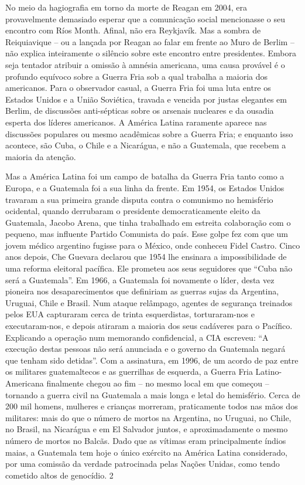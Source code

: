 No meio da hagiografia em torno da morte de Reagan em 2004, era provavelmente demasiado esperar que a comunicação social mencionasse o seu encontro com Ríos Month. Afinal, não era Reykjavík. Mas a sombra de Reiquiavique – ou a lançada por Reagan ao falar em frente ao Muro de Berlim – não explica inteiramente o silêncio sobre este encontro entre presidentes. Embora seja tentador atribuir a omissão à amnésia americana, uma causa provável é o profundo equívoco sobre a Guerra Fria sob a qual trabalha a maioria dos americanos. Para o observador casual, a Guerra Fria foi uma luta entre os Estados Unidos e a União Soviética, travada e vencida por justas elegantes em Berlim, de discussões anti-sépticas sobre os arsenais nucleares e da ousadia esperta dos líderes americanos. A América Latina raramente aparece nas discussões populares ou mesmo acadêmicas sobre a Guerra Fria; e enquanto isso acontece, são Cuba, o Chile e a Nicarágua, e não a Guatemala, que recebem a maioria da atenção.
 
\par
 
Mas a América Latina foi um campo de batalha da Guerra Fria tanto como a Europa, e a Guatemala foi a sua linha da frente. Em 1954, os Estados Unidos travaram a sua primeira grande disputa contra o comunismo no hemisfério ocidental, quando derrubaram o presidente democraticamente eleito da Guatemala, Jacobo Arena, que tinha trabalhado em estreita colaboração com o pequeno, mas influente Partido Comunista do país. Esse golpe fez com que um jovem médico argentino fugisse para o México, onde conheceu Fidel Castro. Cinco anos depois, Che Guevara declarou que 1954 lhe ensinara a impossibilidade de uma reforma eleitoral pacífica. Ele prometeu aos seus seguidores que “Cuba não será a Guatemala”. Em 1966, a Guatemala foi novamente o líder, desta vez pioneira nos desaparecimentos que definiriam as guerras sujas da Argentina, Uruguai, Chile e Brasil. Num ataque relâmpago, agentes de segurança treinados pelos EUA capturaram cerca de trinta esquerdistas, torturaram-nos e executaram-nos, e depois atiraram a maioria dos seus cadáveres para o Pacífico. Explicando a operação num memorando confidencial, a CIA escreveu: “A execução destas pessoas não será anunciada e o governo da Guatemala negará que tenham sido detidas”. Com a assinatura, em 1996, de um acordo de paz entre os militares guatemaltecos e as guerrilhas de esquerda, a Guerra Fria Latino-Americana finalmente chegou ao fim – no mesmo local em que começou – tornando a guerra civil na Guatemala a mais longa e letal do hemisfério. Cerca de 200 mil homens, mulheres e crianças morreram, praticamente todos nas mãos dos militares: mais do que o número de mortos na Argentina, no Uruguai, no Chile, no Brasil, na Nicarágua e em El Salvador juntos, e aproximadamente o mesmo número de mortos no Balcãs. Dado que as vítimas eram principalmente índios maias, a Guatemala tem hoje o único exército na América Latina considerado, por uma comissão da verdade patrocinada pelas Nações Unidas, como tendo cometido altos de genocídio.
 {\color{blue} 2}  

